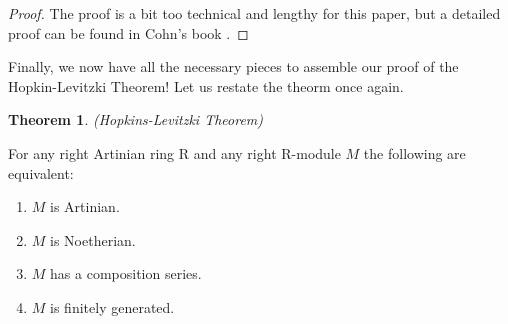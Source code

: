 \documentclass[11pt]{article}
\newtheorem{theorem}{Theorem}[section]
\begin{document}
\noindent
\begin{proof} The proof is a bit too technical and lengthy for this paper, but a detailed proof can be found in Cohn's book \cite{cohn04}. \end{proof}

Finally, we now have all the necessary pieces to assemble our proof of the Hopkin-Levitzki Theorem! Let us restate the theorm once again. \newline

\noindent
\begin{theorem} (Hopkins-Levitzki Theorem) \end{theorem}

For any right Artinian ring R and any right R-module $M$ the following are equivalent:

\noindent
\begin{enumerate}
 \item $M$ is Artinian.
 \item $M$ is Noetherian.
 \item $M$ has a composition series.
 \item $M$ is finitely generated.
\end{enumerate}  
\end{document}
